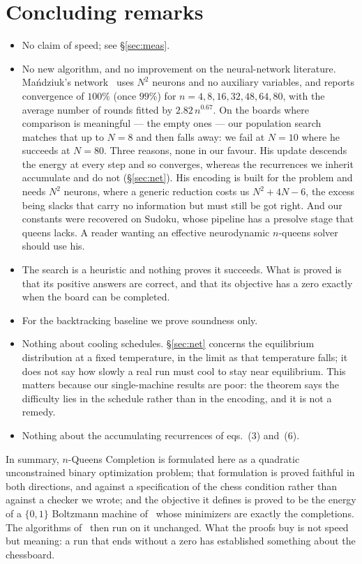 \documentclass{easychair}
\newcommand{\secref}[1]{\hyperref[#1]{\textcolor{academicpurple}{\S\ref*{#1}}}}
\newcommand{\citeref}[1]{\textcolor{academicpurple}{\cite{#1}}}
\begin{document}
\section{Concluding remarks}\label{sec:notclaim}

\begin{itemize}\itemsep2pt
\item No claim of speed; see \secref{sec:meas}.
\item No new algorithm, and no improvement on the neural-network literature. Ma\'{n}dziuk's
network~\citeref{mandziuk1995} uses $N^2$ neurons and no auxiliary variables, and reports convergence of
$100\%$ (once $99\%$) for $n = 4,8,16,32,48,64,80$, with the average number of rounds fitted by
$2.82\,n^{0.67}$. On the boards where comparison is meaningful --- the empty ones --- our population
search matches that up to $N = 8$ and then falls away: we fail at $N = 10$ where he succeeds at
$N = 80$. Three reasons, none in our favour. His update descends the energy at every step and so
converges, whereas the recurrences we inherit accumulate and do not (\secref{sec:net}). His encoding
is built for the problem and needs $N^2$ neurons, where a generic reduction costs us $N^2+4N-6$, the
excess being slacks that carry no information but must still be got right. And our constants were
recovered on Sudoku, whose pipeline has a presolve stage that queens lacks. A reader wanting an
effective neurodynamic $n$-queens solver should use his.
\item The search is a heuristic and nothing proves it succeeds. What is proved is that its positive
answers are correct, and that its objective has a zero exactly when the board can be completed.
\item For the backtracking baseline we prove soundness only.
\item Nothing about cooling schedules. \secref{sec:net} concerns the equilibrium distribution at a
fixed temperature, in the limit as that temperature falls; it does not say how slowly a real run must
cool to stay near equilibrium. This matters because our single-machine results are poor: the theorem
says the difficulty lies in the schedule rather than in the encoding, and it is not a remedy.
\item Nothing about the accumulating recurrences of eqs.~(3) and~(6).
\end{itemize}

In summary, $n$-Queens Completion is formulated here as a quadratic unconstrained binary optimization
problem; that formulation is proved faithful in both directions, and against a specification of the
chess condition rather than against a checker we wrote; and the objective it defines is proved to be
the energy of a $\{0,1\}$ Boltzmann machine of~\citeref{hnbm} whose minimizers are exactly the
completions. The algorithms of~\citeref{liwang2022} then run on it unchanged. What the proofs buy is
not speed but meaning: a run that ends without a zero has established something about the chessboard.
\end{document}
